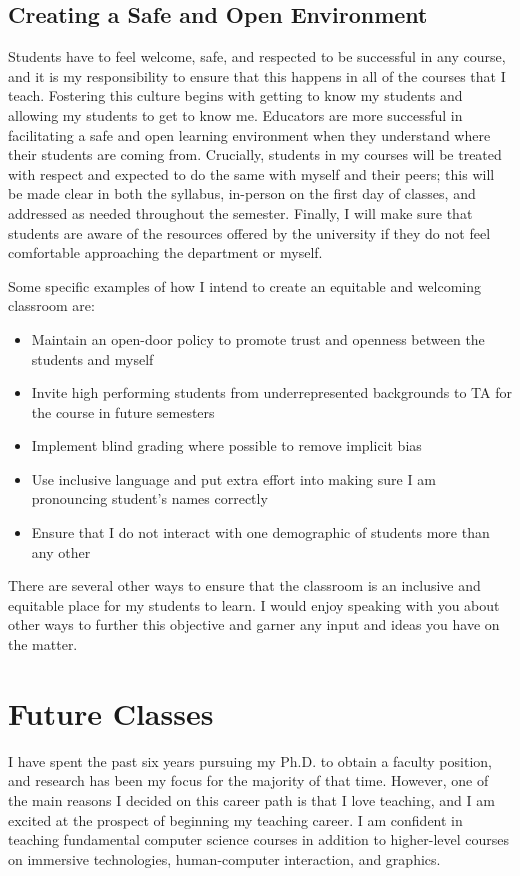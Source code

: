 \subsection*{Creating a Safe and Open Environment}
\vspace{-0.5cm}
Students have to feel welcome, safe, and respected to be successful in any course, and it is my responsibility to  ensure that this happens in all of the courses that I teach. Fostering this culture begins with getting to know my students and allowing my students to get to know me. Educators are more successful in facilitating a safe and open learning environment when they understand where their students are coming from. Crucially, students in my courses will be treated with respect and expected to do the same with myself and their peers; this will be made clear in both the syllabus, in-person on the first day of classes, and addressed as needed throughout the semester. Finally, I will make sure that students are aware of the resources offered by the university if they do not feel comfortable approaching the department or myself.

Some specific examples of how I intend to create an equitable and welcoming classroom are: 
\begin{itemize}
    \item Maintain an open-door policy to promote trust and openness between the students and myself
    \item Invite high performing students from underrepresented backgrounds to TA for the course in future semesters
    \item Implement blind grading where possible to remove implicit bias
    \item Use inclusive language and put extra effort into making sure I am pronouncing student’s names correctly
    \item Ensure that I do not interact with one demographic of students more than any other
\end{itemize}

There are several other ways to ensure that the classroom is an inclusive and equitable place for my students to learn. I would enjoy speaking with you about other ways to further this objective and garner any input and ideas you have on the matter.

\section*{Future Classes}
\vspace{-0.5cm}
I have spent the past six years pursuing my Ph.D. to obtain a faculty position, and research has been my focus for the majority of that time. However, one of the main reasons I decided on this career path is that I love teaching, and I am excited at the prospect of beginning my teaching career. I am confident in teaching fundamental computer science courses in addition to higher-level courses on immersive technologies, human-computer interaction, and graphics.

